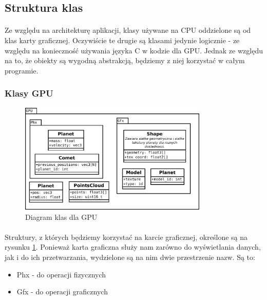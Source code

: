 \subsection{Struktura klas}\label{sub:struktura klas}
\paragraph{}
Ze względu na architekturę aplikacji, klasy używane na CPU oddzielone są od klas karty graficznej. Oczywiście te drugie są klasami jedynie logicznie - ze względu na konieczność używania języka C w kodzie dla GPU. Jednak ze względu na to, że obiekty są wygodną abstrakcją, będziemy z niej korzystać w całym programie.

\subsubsection{Klasy GPU}

\begin{figure}[h]
	\centering
	\includegraphics[angle=0,width=0.8\textwidth]{img/class_gpu.pdf}
	\caption{Diagram klas dla GPU}
	\label{fig:class_gpu}
\end{figure}

\paragraph{}
Struktury, z których będziemy korzystać na karcie graficznej, określone są na rysunku \ref{fig:class_gpu}. Ponieważ karta graficzna służy nam zarówno do wyświetlania danych, jak i do ich przetwarzania, wydzielone są na nim dwie przestrzenie nazw. Są to:
\begin{itemize}
	\item{Phx - do operacji fizycznych}
	\item{Gfx - do operacji graficznych}
\end{itemize}

